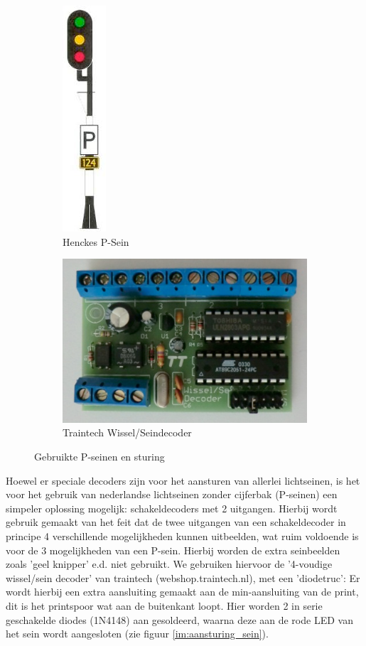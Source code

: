 \documentclass[12pt,a4paper]{report}
\begin{document}
\begin{figure}
  \centering
  \begin{subfigure}{.5\textwidth}
    \includegraphics[scale=0.6]{images/henckes_p_sein}
    \caption{Henckes P-Sein\label{im:psein}}
  \end{subfigure}%
  \begin{subfigure}{.5\textwidth}
    \includegraphics[scale=0.6]{images/seindecoder}
    \caption{Traintech Wissel/Seindecoder\label{im:seindecoder}}
  \end{subfigure}
  \caption{Gebruikte P-seinen en sturing}
\end{figure}

Hoewel er speciale decoders zijn voor het aansturen van allerlei lichtseinen, is het voor het gebruik van nederlandse lichtseinen zonder cijferbak (P-seinen) een simpeler oplossing mogelijk: schakeldecoders met 2 uitgangen. Hierbij wordt gebruik gemaakt van het feit dat de twee uitgangen van een schakeldecoder in principe 4 verschillende mogelijkheden kunnen uitbeelden, wat ruim voldoende is voor de 3 mogelijkheden van een P-sein. Hierbij worden de extra seinbeelden zoals 'geel knipper' e.d. niet gebruikt.
We gebruiken hiervoor de '4-voudige wissel/sein decoder' van traintech (webshop.traintech.nl), met een 'diodetruc':
Er wordt hierbij een extra aansluiting gemaakt aan de min-aansluiting van de print, dit is het printspoor wat aan de buitenkant loopt. Hier worden 2 in serie geschakelde diodes (1N4148) aan gesoldeerd, waarna deze aan de rode LED van het sein wordt aangesloten (zie figuur \ref{im:aansturing_sein}).
\end{document}
